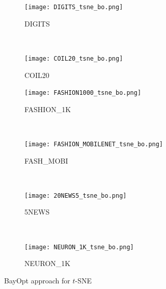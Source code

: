 \begin{figure}%
    \begin{subfigure}[b]{.46\linewidth}
        \centering
        \texttt{[image: DIGITS\_tsne\_bo.png]}
        \caption{DIGITS}
    \end{subfigure}
    ~
    \begin{subfigure}[b]{.46\linewidth}
        \centering
        \texttt{[image: COIL20\_tsne\_bo.png]}
        \caption{COIL20}
    \end{subfigure}
    \vfill
    \begin{subfigure}[b]{.46\linewidth}
        \centering
        \texttt{[image: FASHION1000\_tsne\_bo.png]}
        \caption{{FASHION\_1K}}
    \end{subfigure}
    ~
    \begin{subfigure}[b]{.46\linewidth}
        \centering
        \texttt{[image: FASHION\_MOBILENET\_tsne\_bo.png]}
        \caption{{FASH\_MOBI}}
    \end{subfigure}
    ~
    \vfill
    \begin{subfigure}[b]{.46\linewidth}
        \centering
        \texttt{[image: 20NEWS5\_tsne\_bo.png]}
        \caption{5NEWS}
    \end{subfigure}
    ~
    \begin{subfigure}[b]{.46\linewidth}
        \centering
        \texttt{[image: NEURON\_1K\_tsne\_bo.png]}
        \caption{{NEURON\_1K}}
    \end{subfigure}
    \caption{BayOpt approach for  $t$-SNE}
    \label{fig:tsne:bo:all}
\end{figure}

